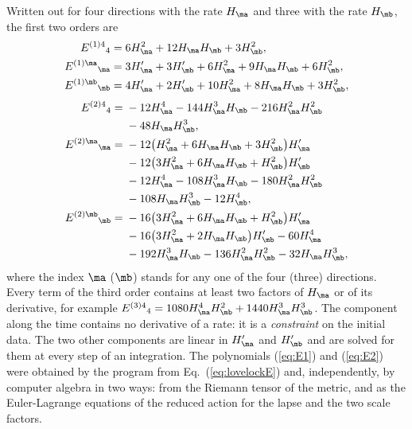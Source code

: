 Written out for four directions with the rate $H_{\ma}$ and three with the rate $H_{\mb}$, the
first two orders are
\begin{equation}
\begin{aligned}
E^{(1)4}{}_{4}={}&6H_{\ma}^{2}+12H_{\ma}H_{\mb}+3H_{\mb}^{2},\\
E^{(1)\ma}{}_{\ma}={}&3H_{\ma}'+3H_{\mb}'+6H_{\ma}^{2}+9H_{\ma}H_{\mb}+6H_{\mb}^{2},\\
E^{(1)\mb}{}_{\mb}={}&4H_{\ma}'+2H_{\mb}'+10H_{\ma}^{2}+8H_{\ma}H_{\mb}+3H_{\mb}^{2},
\end{aligned}
\label{eq:E1}
\end{equation}
\begin{equation}
\begin{aligned}
E^{(2)4}{}_{4}={}&-12H_{\ma}^{4}-144H_{\ma}^{3}H_{\mb}-216H_{\ma}^{2}H_{\mb}^{2}\\
&-48H_{\ma}H_{\mb}^{3},\\
E^{(2)\ma}{}_{\ma}={}&-12\big(H_{\ma}^{2}+6H_{\ma}H_{\mb}+3H_{\mb}^{2}\big)H_{\ma}'\\
&-12\big(3H_{\ma}^{2}+6H_{\ma}H_{\mb}+H_{\mb}^{2}\big)H_{\mb}'\\
&-12H_{\ma}^{4}-108H_{\ma}^{3}H_{\mb}-180H_{\ma}^{2}H_{\mb}^{2}\\
&-108H_{\ma}H_{\mb}^{3}-12H_{\mb}^{4},\\
E^{(2)\mb}{}_{\mb}={}&-16\big(3H_{\ma}^{2}+6H_{\ma}H_{\mb}+H_{\mb}^{2}\big)H_{\ma}'\\
&-16\big(3H_{\ma}^{2}+2H_{\ma}H_{\mb}\big)H_{\mb}'-60H_{\ma}^{4}\\
&-192H_{\ma}^{3}H_{\mb}-136H_{\ma}^{2}H_{\mb}^{2}-32H_{\ma}H_{\mb}^{3},
\end{aligned}
\label{eq:E2}
\end{equation}
where the index $\ma$ ($\mb$) stands for any one of the four (three) directions. Every term of the
third order contains at least two factors of $H_{\ma}$ or of its derivative, for example
$E^{(3)4}{}_{4}=1080H_{\ma}^{4}H_{\mb}^{2}+1440H_{\ma}^{3}H_{\mb}^{3}$. The component along the time
contains no derivative of a rate: it is a \emph{constraint} on the initial data. The two other
components are linear in $H_{\ma}'$ and $H_{\mb}'$ and are solved for them at every step of an
integration. The polynomials (\ref{eq:E1}) and (\ref{eq:E2}) were obtained by the program from
Eq.~(\ref{eq:lovelockE}) and, independently, by computer algebra in two ways: from the Riemann
tensor of the metric, and as the Euler-Lagrange equations of the reduced action for the lapse and
the two scale factors.

